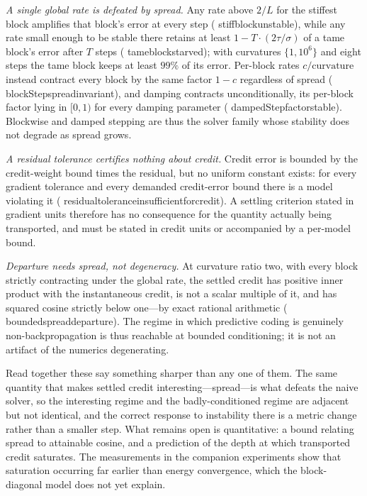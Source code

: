 \documentclass[11pt]{article}
\newcommand{\leanname}[1]{{\scriptsize\ttfamily
  \def\_{\textunderscore\allowbreak}#1}}
\begin{document}
\emph{A single global rate is defeated by spread.} Any rate above $2/L$ for the stiffest
block amplifies that block's error at every step
(\leanname{stiff\_block\_unstable}), while any rate small enough to be stable there
retains at least $1 - T\cdot(2\tau/\sigma)$ of a tame block's error after $T$ steps
(\leanname{tame\_block\_starved}); with curvatures $\{1,10^{6}\}$ and eight steps the
tame block keeps at least $99\%$ of its error. Per-block rates $c/\text{curvature}$
instead contract every block by the same factor $1-c$ regardless of spread
(\leanname{blockStep\_spread\_invariant}), and damping contracts unconditionally, its
per-block factor lying in $[0,1)$ for every damping parameter
(\leanname{dampedStep\_factor\_stable}). Blockwise and damped stepping are thus the
solver family whose stability does not degrade as spread grows.

\emph{A residual tolerance certifies nothing about credit.} Credit error is bounded by
the credit-weight bound times the residual, but no uniform constant exists: for every
gradient tolerance and every demanded credit-error bound there is a model violating it
(\leanname{residual\_tolerance\_insufficient\_for\_credit}). A settling criterion stated
in gradient units therefore has no consequence for the quantity actually being
transported, and must be stated in credit units or accompanied by a per-model bound.

\emph{Departure needs spread, not degeneracy.} At curvature ratio two, with every block
strictly contracting under the global rate, the settled credit has positive inner product
with the instantaneous credit, is not a scalar multiple of it, and has squared cosine
strictly below one---by exact rational arithmetic
(\leanname{bounded\_spread\_departure}). The regime in which predictive coding is
genuinely non-backpropagation is thus reachable at bounded conditioning; it is not an
artifact of the numerics degenerating.

Read together these say something sharper than any one of them. The same quantity that
makes settled credit interesting---spread---is what defeats the naive solver, so the
interesting regime and the badly-conditioned regime are adjacent but not identical, and
the correct response to instability there is a metric change rather than a smaller step.
What remains open is quantitative: a bound relating spread to attainable cosine, and a
prediction of the depth at which transported credit saturates. The measurements in the
companion experiments show that saturation occurring far earlier than energy convergence,
which the block-diagonal model does not yet explain.
\end{document}
